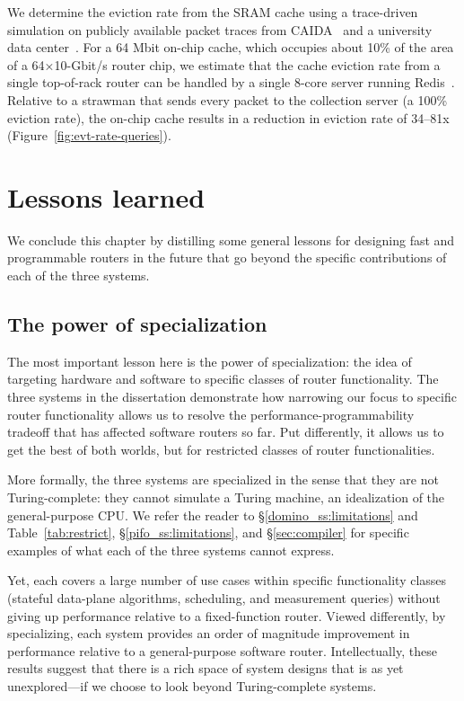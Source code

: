  We determine the eviction rate from the SRAM cache using a trace-driven
simulation on publicly available packet traces from CAIDA~\cite{caida2016,
caida2014} and a university data center~\cite{theo_dc}. For a 64 Mbit on-chip
cache, which occupies about 10\% of the area of a 64×10-Gbit/s router chip, we
estimate that the cache eviction rate from a single top-of-rack router can be
handled by a single 8-core server running Redis~\cite{redis}. Relative to a
strawman that sends every packet to the collection server (\ie a 100\% eviction
rate), the on-chip cache results in a reduction in eviction rate of 34--81x
(Figure~\ref{fig:evt-rate-queries}).

\section{Lessons learned} We conclude this chapter by distilling some general
lessons for designing fast and programmable routers in the future that go
beyond the specific contributions of each of the three systems.

\subsection{The power of specialization} The most important lesson here is the
power of specialization: the idea of targeting hardware and software to
specific classes of router functionality.  The three systems in the
dissertation demonstrate how narrowing our focus to specific router
functionality allows us to resolve the performance-programmability tradeoff
that has affected software routers so far. Put differently, it allows us to get
the best of both worlds, but for restricted classes of router functionalities.

More formally, the three systems are specialized in the sense that they are not
Turing-complete: they cannot simulate a Turing machine, an idealization of the
general-purpose CPU.  We refer the reader to \S\ref{domino_ss:limitations} and
Table~\ref{tab:restrict}, \S\ref{pifo_ss:limitations}, and \S\ref{sec:compiler}
for specific examples of what each of the three systems cannot express.

Yet, each covers a large number of use cases within specific functionality
classes (stateful data-plane algorithms, scheduling, and measurement queries)
without giving up performance relative to a fixed-function router. Viewed
differently, by specializing, each system provides an order of magnitude
improvement in performance relative to a general-purpose software router.
Intellectually, these results suggest that there is a rich space of system
designs that is as yet unexplored---if we choose to look beyond Turing-complete
systems. 

